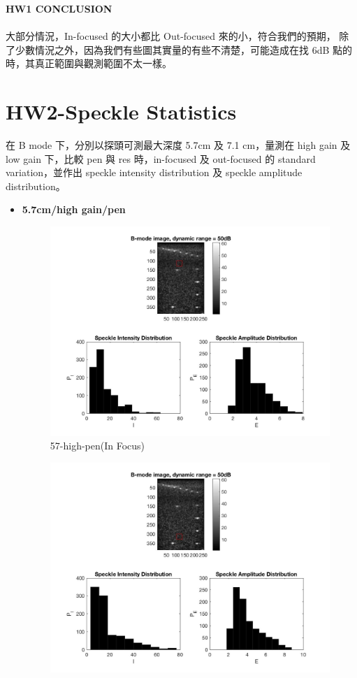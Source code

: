 \documentclass[12pts,a4paper]{article}
\begin{document}
\textbf{HW1 CONCLUSION} \\
\\
大部分情況，In-focused 的大小都比 Out-focused 來的小，符合我們的預期， 除了少數情況之外，因為我們有些圖其實量的有些不清楚，可能造成在找 6dB 點的時，其真正範圍與觀測範圍不太一樣。
\section{HW2-Speckle Statistics}
在 B mode 下，分別以探頭可測最大深度 5.7cm 及 7.1 cm，量測在 high gain 及 low gain 下，比較 pen 與 res 時，in-focused 及 out-focused 的 standard variation，並作出 speckle intensity distribution 及 speckle amplitude distribution。

\begin{itemize}
\item{\textbf{5.7cm/high gain/pen}}
\begin{center}
\end{center}
\begin{figure}[h]
    \centering
    \includegraphics[width=1.0\textwidth]{img_hw2/57-high-pen1.jpg}
    \caption{57-high-pen(In Focus)}
    \label{fig:mesh1}
\end{figure}
\pagebreak
\begin{figure}[h]
    \centering
    \includegraphics[width=1.0\textwidth]{img_hw2/57-high-pen2.jpg}

\end{figure}
\end{itemize}
\end{document}
